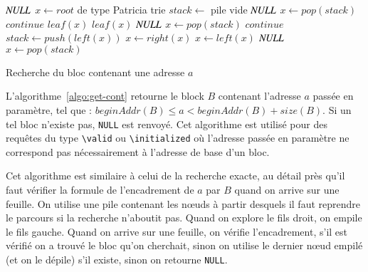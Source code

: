 \begin{algorithm}[h!]
\begin{algorithmic}
  \Return $\mathit{NULL}$
\Else
  \State $x \gets \mathit{root}$ de type Patricia trie
  \State $\mathit{stack} \gets$ pile vide
          \Return $\mathit{NULL}$
        \Else
          \State $x \gets \mathit{pop(stack)}$
          \State $\mathit{continue}$
        \EndIf
        \Return $\mathit{leaf(x)}$
        \Return $\mathit{leaf(x)}$
        \Return $\mathit{NULL}$
      \Else
        \State $x \gets \mathit{pop(stack)}$
        \State $\mathit{continue}$
      \EndIf
    \EndIf
      \State $\mathit{stack} \gets \mathit{push(left(x))}$
      \State $x \gets \mathit{right(x)}$
      \State $x \gets \mathit{left(x)}$
      \Return $\mathit{NULL}$
    \Else
      \State $x \gets \mathit{pop(stack)}$
    \EndIf
  \EndWhile
\EndIf
\end{algorithmic}
\caption{Recherche du bloc contenant une adresse $a$
  \label{algo:get-cont}}
\end{algorithm}

L'algorithme~\ref{algo:get-cont} retourne le block $B$ contenant
l'adresse $a$ passée en paramètre, tel que :
$beginAddr(B) \le a < beginAddr(B) + size(B)$.
Si un tel bloc n'existe pas, \lstinline{NULL} est renvoyé.
Cet algorithme est utilisé pour des requêtes du type \lstinline{\valid} ou
\lstinline{\initialized} où l'adresse passée en paramètre ne correspond pas
nécessairement à l'adresse de base d'un bloc.

Cet algorithme est similaire à celui de la recherche exacte, au détail près
qu'il faut vérifier la formule de l'encadrement de $a$ par $B$ quand on arrive
sur une feuille.
On utilise une pile contenant les n\oe{}uds à partir desquels il faut reprendre
le parcours si la recherche n'aboutit pas.
Quand on explore le fils droit, on empile le fils gauche.
Quand on arrive sur une feuille, on vérifie l'encadrement, s'il est vérifié on
a trouvé le bloc qu'on cherchait, sinon on utilise le dernier n\oe{}ud empilé
(et on le dépile) s'il existe, sinon on retourne \lstinline{NULL}.


